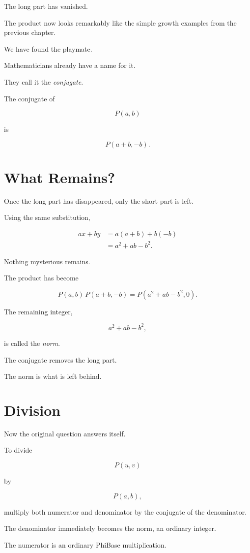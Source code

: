 The long part has vanished.

The product now looks remarkably like the simple growth examples from the previous chapter.

We have found the playmate.

Mathematicians already have a name for it.

They call it the \emph{conjugate}.

The conjugate of

\[
P(a,b)
\]

is

\[
P(a+b,-b).
\]

\section*{What Remains?}

Once the long part has disappeared, only the short part is left.

Using the same substitution,

\[
\begin{aligned}
ax+by
 &=a(a+b)+b(-b)\\
 &=a^{2}+ab-b^{2}.
\end{aligned}
\]

Nothing mysterious remains.

The product has become

\[
P(a,b)\,P(a+b,-b)
=
P(a^{2}+ab-b^{2},0).
\]

The remaining integer,

\[
a^{2}+ab-b^{2},
\]

is called the \emph{norm}.

The conjugate removes the long part.

The norm is what is left behind.

\section*{Division}

Now the original question answers itself.

To divide

\[
P(u,v)
\]

by

\[
P(a,b),
\]

multiply both numerator and denominator by the conjugate of the denominator.

The denominator immediately becomes the norm, an ordinary integer.

The numerator is an ordinary PhiBase multiplication.

